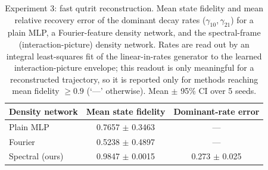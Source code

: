 \begin{table}[ht]
\centering
\caption{Experiment 3: fast qutrit reconstruction. Mean state fidelity and mean relative recovery error of the dominant decay rates ($\gamma_{10},\gamma_{21}$) for a plain MLP, a Fourier-feature density network, and the spectral-frame (interaction-picture) density network. Rates are read out by an integral least-squares fit of the linear-in-rates generator to the learned interaction-picture envelope; this readout is only meaningful for a reconstructed trajectory, so it is reported only for methods reaching mean fidelity $\ge0.9$ (`---' otherwise). Mean $\pm$ 95\% CI over 5 seeds.}
\label{tab:exp3}
\begin{tabular}{lcc}
\toprule
Density network & Mean state fidelity & Dominant-rate error \\
\midrule
Plain MLP & 0.7657 $\pm$ 0.3463 & --- \\
Fourier & 0.5238 $\pm$ 0.4897 & --- \\
Spectral (ours) & 0.9847 $\pm$ 0.0015 & 0.273 $\pm$ 0.025 \\
\bottomrule
\end{tabular}
\end{table}
